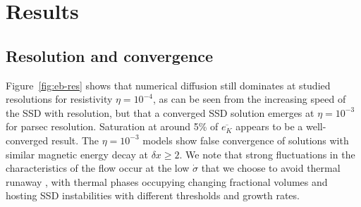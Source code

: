 \documentclass[preprint2]{aastex63}
\newcommand\dx{ {\delta x}}
\begin{document}

\section{Results} \label{sec:results}

\subsection{{Resolution and convergence}} \label{sec:conv}
{Figure~\ref{fig:eb-res} shows
 that numerical diffusion still dominates at studied
 resolutions for resistivity  $\eta = 10^{-4}$, as can be seen from the
 increasing speed of the SSD with resolution, but that a converged SSD solution
 emerges at  $\eta = 10^{-3}$ for parsec resolution.}
 Saturation at around 5\% of $\overline{e_K}$ appears to be a well-converged
 result.
 {The $\eta = 10^{-3}$ models show} false convergence
 \citep{FMA91} of solutions with similar magnetic energy decay at $\dx\geq2$.
 {We note that strong fluctuations in the characteristics of the flow
 {occur at the} low $\dot\sigma$ {that we choose to avoid thermal runaway
 \citep{LOCBN15},} with thermal phases occupying changing fractional volumes
 \citep[e.g.][]{gatto2015} and hosting SSD instabilities with different 
 thresholds and growth rates.
 }
\end{document}
